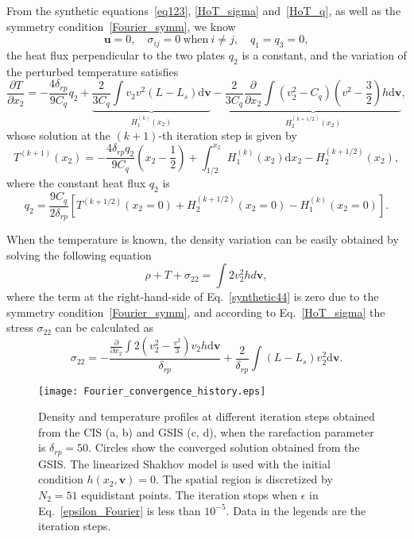 From the synthetic equations~\eqref{eq123}, \eqref{HoT_sigma} and~\eqref{HoT_q}, as well as the symmetry condition~\eqref{Fourier_symm}, we know
\begin{equation}
\bm{u}=0, \quad \sigma_{ij}=0~ \text{when}~ i\neq{j}, \quad q_1=q_3=0,
\end{equation}
the heat flux perpendicular to the two plates $q_2$ is a constant, and
the variation of the perturbed temperature satisfies
\begin{equation}\label{HoT_q_Fourier}
\frac{\partial T}{\partial x_2}=-\frac{4\delta_{rp}}{9C_q}q_{2}+\underbrace{\frac{2}{3C_q}\int{}v_2v^2(L-L_{s})\mathrm{d}\bm{v}}_{H_1^{(k)}(x_2)}-\underbrace{\frac{2}{3C_q}\frac{\partial }{\partial x_2}\int{}(v_2^2-C_q)\left(v^2-\frac{3}{2}\right)h\mathrm{d}\bm{v}}_{H_2^{(k+1/2)}(x_2)},
\end{equation}
whose solution at the $(k+1)$-th iteration step is given by 
\begin{equation}
T^{(k+1)}(x_2)=-\frac{4\delta_{rp}{q}_2}{9C_q}\left(x_2-\frac{1}{2}\right)+\int_{1/2}^{x_2}H_1^{(k)}(x_2)\mathrm{d}x_2-H_2^{(k+1/2)}(x_2),
\end{equation}
where the constant heat flux $q_2$ is
\begin{equation}
q_2=\frac{9C_q}{2\delta_{rp}}\left[
T^{(k+1/2)}(x_2=0)+H_2^{(k+1/2)}(x_2=0)-H_1^{(k)}(x_2=0) \right].
\end{equation}


When the temperature is known, the density variation can be easily obtained by solving the following equation
\begin{equation}\label{synthetic44}
\rho+T+\sigma_{22}=\int{2v_2^2}hd\bm{v},
\end{equation}
where the term at the right-hand-side of Eq.~\eqref{synthetic44} is zero due to the symmetry condition~\eqref{Fourier_symm}, and according to Eq.~\eqref{HoT_sigma} the stress $\sigma_{22}$ can be calculated as
\begin{equation}\label{HoT_sigma_Fourier}
\sigma_{22} 
=-\frac{\frac{\partial}{\partial x_2}\int{}2\left(v_2^2-\frac{v^2}{3}\right)v_2h\mathrm{d}\bm{v}}{\delta_{rp}}+\frac{2}{\delta_{rp}}\int{(L-L_s)v_2^2}\mathrm{d}\bm{v}.
\end{equation}


\begin{figure}[t]
	\centering
	\texttt{[image: Fourier\_convergence\_history.eps]}
	\caption{Density and temperature profiles at different iteration steps obtained from the CIS (a, b) and GSIS (c, d), when the rarefaction parameter is $\delta_{rp} = 50$. Circles show the converged solution obtained from the GSIS. The linearized Shakhov model is used with the initial condition  $h(x_2,\bm{v})=0$. The spatial region is discretized by $N_2=51$ equidistant points. The iteration stops when $\epsilon$ in Eq.~\eqref{epsilon_Fourier} is less than $10^{-5}$. Data in the legends are the iteration steps.}
	\label{fig:Fourier_histroy}
\end{figure}


